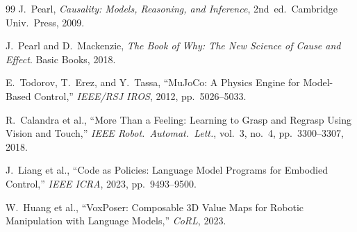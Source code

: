 \documentclass[journal]{IEEEtran}
\begin{document}
\begin{thebibliography}{99}
J.~Pearl, \emph{Causality: Models, Reasoning, and Inference},
2nd~ed.\ Cambridge Univ.\ Press, 2009.

J.~Pearl and D.~Mackenzie, \emph{The Book of Why: The New Science
of Cause and Effect}. Basic Books, 2018.

E.~Todorov, T.~Erez, and Y.~Tassa,
``MuJoCo: A Physics Engine for Model-Based Control,''
\emph{IEEE/RSJ IROS}, 2012, pp.~5026--5033.

R.~Calandra et al., ``More Than a Feeling: Learning to Grasp and
Regrasp Using Vision and Touch,''
\emph{IEEE Robot.\ Automat.\ Lett.}, vol.~3, no.~4,
pp.~3300--3307, 2018.

J.~Liang et al., ``Code as Policies: Language Model Programs for
Embodied Control,'' \emph{IEEE ICRA}, 2023, pp.~9493--9500.

W.~Huang et al., ``VoxPoser: Composable 3D Value Maps for Robotic
Manipulation with Language Models,'' \emph{CoRL}, 2023.

\end{thebibliography}
\end{document}
